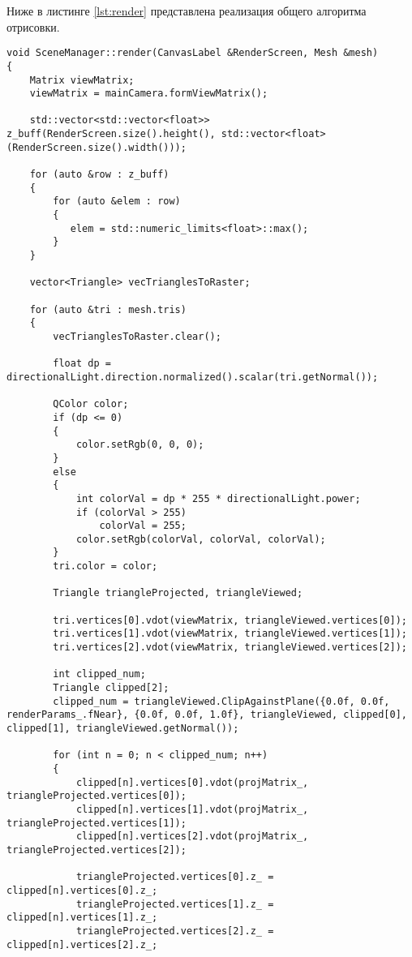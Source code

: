Ниже в листинге \ref{lst:render} представлена реализация общего алгоритма отрисовки.

\begin{lstlisting}[caption = Реализация общего алгоритма отрисовки, label = lst:render]
void SceneManager::render(CanvasLabel &RenderScreen, Mesh &mesh)
{
    Matrix viewMatrix;
    viewMatrix = mainCamera.formViewMatrix();

    std::vector<std::vector<float>> z_buff(RenderScreen.size().height(), std::vector<float>(RenderScreen.size().width()));

    for (auto &row : z_buff)
    {
        for (auto &elem : row)
        {
           elem = std::numeric_limits<float>::max();
        }
    }

    vector<Triangle> vecTrianglesToRaster;

    for (auto &tri : mesh.tris)
    {
        vecTrianglesToRaster.clear();

        float dp = directionalLight.direction.normalized().scalar(tri.getNormal());

        QColor color;
        if (dp <= 0)
        {
            color.setRgb(0, 0, 0);
        }
        else
        {
            int colorVal = dp * 255 * directionalLight.power;
            if (colorVal > 255)
                colorVal = 255;
            color.setRgb(colorVal, colorVal, colorVal);
        }
        tri.color = color;

        Triangle triangleProjected, triangleViewed;

        tri.vertices[0].vdot(viewMatrix, triangleViewed.vertices[0]);
        tri.vertices[1].vdot(viewMatrix, triangleViewed.vertices[1]);
        tri.vertices[2].vdot(viewMatrix, triangleViewed.vertices[2]);

        int clipped_num;
        Triangle clipped[2];
        clipped_num = triangleViewed.ClipAgainstPlane({0.0f, 0.0f, renderParams_.fNear}, {0.0f, 0.0f, 1.0f}, triangleViewed, clipped[0], clipped[1], triangleViewed.getNormal());

        for (int n = 0; n < clipped_num; n++)
        {
            clipped[n].vertices[0].vdot(projMatrix_, triangleProjected.vertices[0]);
            clipped[n].vertices[1].vdot(projMatrix_, triangleProjected.vertices[1]);
            clipped[n].vertices[2].vdot(projMatrix_, triangleProjected.vertices[2]);

            triangleProjected.vertices[0].z_ = clipped[n].vertices[0].z_;
            triangleProjected.vertices[1].z_ = clipped[n].vertices[1].z_;
            triangleProjected.vertices[2].z_ = clipped[n].vertices[2].z_;


\end{lstlisting}
